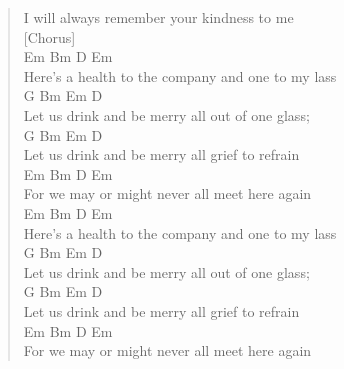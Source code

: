 \documentclass[11pt]{article}
\begin{document}
\begin{verse}
I will always remember your kindness to me\\
\vspace*{1em}
\vspace*{1em}
[Chorus]\\
\hspace*{9em}Em            Bm          D         Em\\
Here's a health to the company and one to my lass\\
\hspace*{7em}G         Bm Em                   D\\
Let us drink and be merry all out of one glass;\\
\hspace*{7em}G         Bm Em                   D\\
Let us drink and be merry all grief to refrain\\
\hspace*{7em}Em           Bm        D          Em\\
For we may or might never all meet here again\\
\vspace*{1em}
\hspace*{9em}Em            Bm          D         Em\\
Here's a health to the company and one to my lass\\
\hspace*{7em}G         Bm Em                   D\\
Let us drink and be merry all out of one glass;\\
\hspace*{7em}G         Bm Em                   D\\
Let us drink and be merry all grief to refrain\\
\hspace*{7em}Em           Bm        D          Em\\
For we may or might never all meet here again\\
\end{verse}
\clearpage
\end{document}
